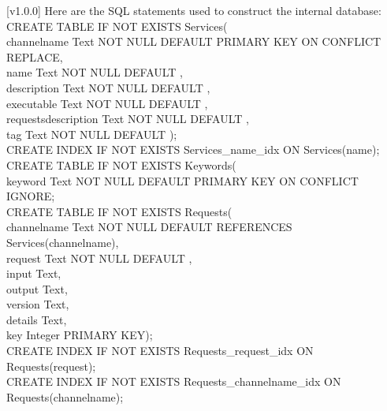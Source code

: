 [v1.0.0]
%
Here are the SQL statements used to construct the internal database:
\outputBegin{}
\settowidth{\uL}{CREATE }%
CREATE TABLE IF NOT EXISTS Services(\\
\hspace*{\uL}channelname Text NOT NULL DEFAULT \fUS{} PRIMARY KEY ON CONFLICT REPLACE,\\
\hspace*{\uL}name Text NOT NULL DEFAULT \fUS,\\
\hspace*{\uL}description Text NOT NULL DEFAULT \fUS,\\
\hspace*{\uL}executable Text NOT NULL DEFAULT \fUS,\\
\hspace*{\uL}requestsdescription Text NOT NULL DEFAULT \fUS,\\
\hspace*{\uL}tag Text NOT NULL DEFAULT  \fUS);\\
CREATE INDEX IF NOT EXISTS Services\_name\_idx ON Services(name);\\
CREATE TABLE IF NOT EXISTS Keywords(\\
\hspace*{\uL}keyword Text NOT NULL DEFAULT \fUS{} PRIMARY KEY ON CONFLICT IGNORE;\\
CREATE TABLE IF NOT EXISTS Requests(\\
\hspace*{\uL}channelname Text NOT NULL DEFAULT \fUS{} REFERENCES Services(channelname),\\
\hspace*{\uL}request Text NOT NULL DEFAULT \fUS,\\
\hspace*{\uL}input Text,\\
\hspace*{\uL}output Text,\\
\hspace*{\uL}version Text,\\
\hspace*{\uL}details Text,\\
\hspace*{\uL}key Integer PRIMARY KEY);\\
CREATE INDEX IF NOT EXISTS Requests\_request\_idx ON Requests(request);\\
CREATE INDEX IF NOT EXISTS Requests\_channelname\_idx ON Requests(channelname);\\

